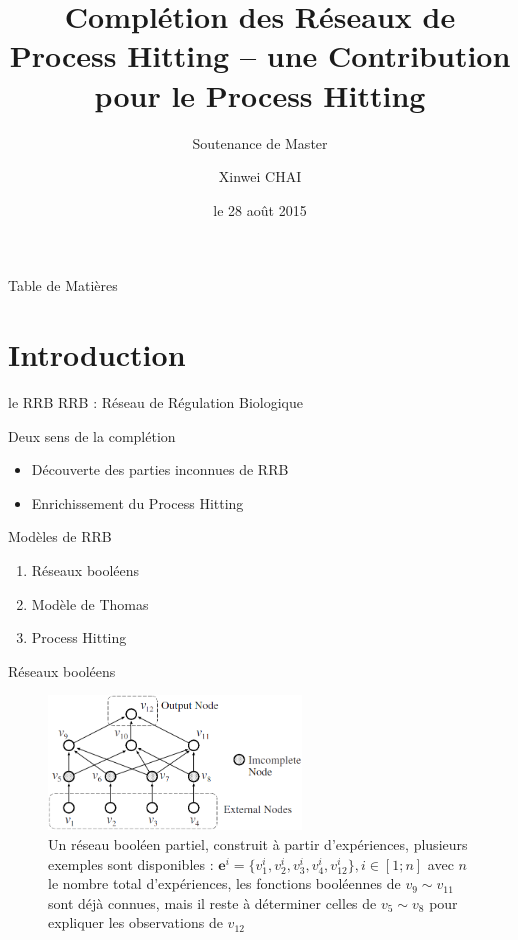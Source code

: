 \documentclass[french]{beamer}
\title{Complétion des Réseaux de Process Hitting -- une Contribution pour le Process Hitting}
\subtitle{Soutenance de Master}
\author[X.CHAI]{Xinwei CHAI}
\date{le 28 août 2015}
\institute[ECN]{École Centrale de Nantes -- IRCCyN}
\begin{document}
\begin{frame}
	\titlepage
\end{frame}

\begin{frame}{Table de Mati\`eres}
	\tableofcontents
\end{frame}

\section{Introduction}
\begin{frame}{le RRB}
	RRB : Réseau de Régulation Biologique\vspace{0.5cm}

	Deux sens de la complétion
	\begin{itemize}
	\item Découverte des parties inconnues de RRB
	\item Enrichissement du Process Hitting
	\end{itemize}
\end{frame}
\begin{frame}{Modèles de RRB}
	\begin{enumerate}
	\item Réseaux booléens\cite{Akutsu2009}
	\item Modèle de Thomas\cite{Thomas1978}
	\item Process Hitting\cite{Pauleve2014,pauleve2011modelisation,Pauleve2012}
	\end{enumerate}
\end{frame}

\begin{frame}{Réseaux booléens} 
\begin{figure}
\centering
\includegraphics[width=0.6\textwidth]{Boolean.png}
\caption{Un réseau booléen partiel, construit à partir d'expériences, plusieurs exemples sont disponibles : $\mathbf{e}^i=\{v_1^i,v_2^i,v_3^i,v_4^i,v_{12}^i\}, i\in[1;n]$ avec $n$ le nombre total d'expériences, les fonctions booléennes de $v_9\sim v_{11}$ sont déjà connues, mais il reste à déterminer celles de $v_5\sim v_8$ pour expliquer les observations de $v_{12}$}
\end{figure}
\end{frame}
\end{document}
